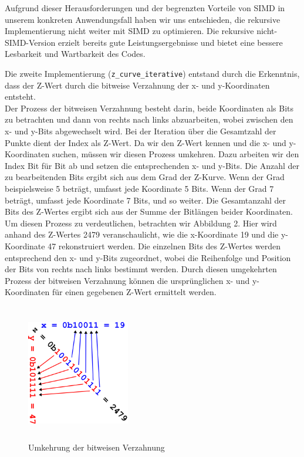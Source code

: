 \documentclass[course=erap]{aspdoc}
\begin{document}
\noindent Aufgrund dieser Herausforderungen und der begrenzten Vorteile von SIMD in unserem konkreten Anwendungsfall haben wir uns entschieden, die rekursive Implementierung nicht weiter mit SIMD zu optimieren. Die rekursive nicht-SIMD-Version erzielt bereits gute Leistungsergebnisse und bietet eine bessere Lesbarkeit und Wartbarkeit des Codes.

\noindent Die zweite Implementierung (\texttt{z\_curve\_iterative}) entstand durch die Erkenntnis, dass der Z-Wert durch die bitweise Verzahnung der x- und y-Koordinaten entsteht. \\
Der Prozess der bitweisen Verzahnung besteht darin, beide Koordinaten als Bits zu betrachten und dann von rechts nach links abzuarbeiten, wobei zwischen den x- und y-Bits abgewechselt wird. Bei der Iteration über die Gesamtzahl der Punkte dient der Index als Z-Wert. Da wir den Z-Wert kennen und die x- und y-Koordinaten suchen, müssen wir diesen Prozess umkehren. Dazu arbeiten wir den Index Bit für Bit ab und setzen die entsprechenden x- und y-Bits. Die Anzahl der zu bearbeitenden Bits ergibt sich aus dem Grad der Z-Kurve. Wenn der Grad beispielsweise 5 beträgt, umfasst jede Koordinate 5 Bits. Wenn der Grad 7 beträgt, umfasst jede Koordinate 7 Bits, und so weiter. Die Gesamtanzahl der Bits des Z-Wertes ergibt sich aus der Summe der Bitlängen beider Koordinaten.\\
Um diesen Prozess zu verdeutlichen, betrachten wir Abbildung 2. Hier wird anhand des Z-Wertes 2479 veranschaulicht, wie die x-Koordinate 19 und die y-Koordinate 47 rekonstruiert werden. Die einzelnen Bits des Z-Wertes werden entsprechend den x- und y-Bits zugeordnet, wobei die Reihenfolge und Position der Bits von rechts nach links bestimmt werden. Durch diesen umgekehrten Prozess der bitweisen Verzahnung können die ursprünglichen x- und y-Koordinaten für einen gegebenen Z-Wert ermittelt werden.
\setlength{\parskip}{1em}

\begin{figure}[H]
        \centering
        \includegraphics[width=0.4\textwidth, height=6cm]{bit_interleaving.png}
        \caption{Umkehrung der bitweisen Verzahnung}
        \label{fig:Bit Interleaving}
    \end{figure}
\end{document}
